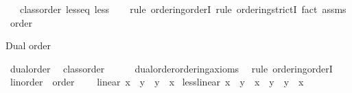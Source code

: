 \begin{isabellebody}
\ \ \ {\isachardoublequoteopen}class{\isachardot}{\kern0pt}order\ less{\isacharunderscore}{\kern0pt}eq\ less{\isachardoublequoteclose}\isanewline
%
\isadelimproof
\ \ %
\endisadelimproof
%
\isatagproof
{}\isamarkupfalse%
\ {\isacharparenleft}{\kern0pt}rule\ ordering{\isacharunderscore}{\kern0pt}orderI{\isacharparenright}{\kern0pt}\ {\isacharparenleft}{\kern0pt}rule\ ordering{\isacharunderscore}{\kern0pt}strictI{\isacharcomma}{\kern0pt}\ {\isacharparenleft}{\kern0pt}fact\ assms{\isacharparenright}{\kern0pt}{\isacharplus}{\kern0pt}{\isacharparenright}{\kern0pt}%
\endisatagproof
{\isafoldproof}%
%
\isadelimproof
\isanewline
%
\endisadelimproof
\isanewline
{}\isamarkupfalse%
\ order\isanewline
{}%
\begin{isamarkuptext}%
Dual order%
\end{isamarkuptext}\isamarkuptrue%
\isamarkupfalse%
\ dual{\isacharunderscore}{\kern0pt}order{\isacharcolon}{\kern0pt}\isanewline
\ \ {\isachardoublequoteopen}class{\isachardot}{\kern0pt}order\ {\isacharparenleft}{\kern0pt}{\isasymge}{\isacharparenright}{\kern0pt}\ {\isacharparenleft}{\kern0pt}{\isachargreater}{\kern0pt}{\isacharparenright}{\kern0pt}{\isachardoublequoteclose}\isanewline
%
\isadelimproof
\ \ %
\endisadelimproof
%
\isatagproof
{}\isamarkupfalse%
\ dual{\isacharunderscore}{\kern0pt}order{\isachardot}{\kern0pt}ordering{\isacharunderscore}{\kern0pt}axioms\ \isamarkupfalse%
\ {\isacharparenleft}{\kern0pt}rule\ ordering{\isacharunderscore}{\kern0pt}orderI{\isacharparenright}{\kern0pt}%
\endisatagproof
{\isafoldproof}%
%
\isadelimproof
\isanewline
%
\endisadelimproof
\isanewline
{}\isamarkupfalse%
%
\isadelimdocument
%
\endisadelimdocument
%
\isatagdocument
%
\isamarkuptrue%
%
\endisatagdocument
{\isafolddocument}%
%
\isadelimdocument
%
\endisadelimdocument
{}\isamarkupfalse%
\ linorder\ {\isacharequal}{\kern0pt}\ order\ {\isacharplus}{\kern0pt}\isanewline
\ \ \ linear{\isacharcolon}{\kern0pt}\ {\isachardoublequoteopen}x\ {\isasymle}\ y\ {\isasymor}\ y\ {\isasymle}\ x{\isachardoublequoteclose}\isanewline
{}\isanewline
\isanewline
{}\isamarkupfalse%
\ less{\isacharunderscore}{\kern0pt}linear{\isacharcolon}{\kern0pt}\ {\isachardoublequoteopen}x\ {\isacharless}{\kern0pt}\ y\ {\isasymor}\ x\ {\isacharequal}{\kern0pt}\ y\ {\isasymor}\ y\ {\isacharless}{\kern0pt}\ x{\isachardoublequoteclose}\isanewline
%
\isadelimproof

\end{isabellebody}
